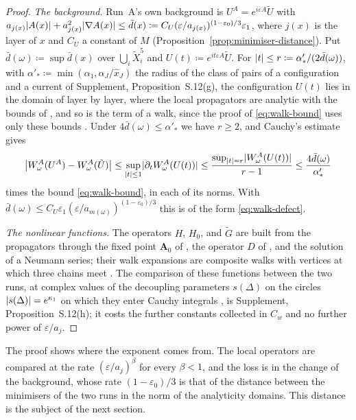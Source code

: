 \documentclass[11pt]{preprint}
\DeclarePairedDelimiter{\abs}{\lvert}{\rvert}
\numberwithin{equation}{section}
\theoremstyle{definition}
\theoremstyle{remark}
\theoremstyle{plain}
\begin{document}
\begin{proof}
\emph{The background.} Run~A's own background is $U^A = e^{i\varepsilon A}\tilde U$ with $a_{j(x)}\abs{A(x)} + a_{j(x)}^2\abs{\nabla A(x)} \leq \bar d(x) \coloneqq C_U(\varepsilon/a_{j(x)})^{(1-\varepsilon_0)/3}\varepsilon_1$, where $j(x)$ is the layer of $x$ and $C_U$ a constant of $M$ (Proposition~\ref{prop:minimiser-distance}). Put $\bar d(\omega) \coloneqq \sup\bar d(x)$ over $\bigcup_i\tilde X_i^5$ and $U(t) \coloneqq e^{it\varepsilon A}\tilde U$. For $\abs{t} \leq r \coloneqq \alpha'_*/(2\bar d(\omega))$, with $\alpha'_* \coloneqq \min(\alpha_1, \alpha_J/\hat x_J)$ the radius of the class of pairs of a configuration and a current of Supplement, Proposition~S.12(g), the configuration $U(t)$ lies in the domain of \cite[(3.37)]{BalabanPBG} layer by layer, where the local propagators are analytic with the bounds of \cite[Theorems~3.1--3.3]{BalabanPBG} \cite[Theorem~3.4, p.~400]{BalabanPBG}, and so is the term of a walk, since the proof of \eqref{eq:walk-bound} uses only these bounds \cite[p.~410]{BalabanPBG}. Under $4\bar d(\omega) \leq \alpha'_*$ we have $r \geq 2$, and Cauchy's estimate gives
\begin{equation}\label{eq:background-change}
    \bigl\lvert W^A_\omega(U^A) - W^A_\omega(\tilde U)\bigr\rvert \leq \sup_{\abs{t} \leq 1}\abs{\partial_tW^A_\omega(U(t))} \leq \frac{\sup_{\abs{t} = r}\abs{W^A_\omega(U(t))}}{r - 1} \leq \frac{4\bar d(\omega)}{\alpha'_*}
\end{equation}
times the bound \eqref{eq:walk-bound}, in each of its norms. With $\bar d(\omega) \leq C_U\varepsilon_1(\varepsilon/a_{m(\omega)})^{(1-\varepsilon_0)/3}$ this is of the form \eqref{eq:walk-defect}.

\emph{The nonlinear functions.} The operators $H$, $H_0$, and $\tilde G$ are built from the propagators through the fixed point $\mathbf A_0$ of \cite[(1.4), p.~2]{BalabanRG2}, the operator $D$ of \cite[(1.3)]{BalabanRG2}, and the solution of a Neumann series; their walk expansions are composite walks with vertices at which three chains meet \cite[p.~427]{BalabanPBG}. The comparison of these functions between the two runs, at complex values of the decoupling parameters $s(\Delta)$ on the circles $\abs{s(\Delta)} = e^{\kappa_1}$ on which they enter Cauchy integrals \cite[(1.23), p.~7]{BalabanRG2}, is Supplement, Proposition~S.12(h); it costs the further constants collected in $C_w$ and no further power of $\varepsilon/a_j$.
\end{proof}

The proof shows where the exponent comes from. The local operators are compared at the rate $(\varepsilon/a_j)^\beta$ for every $\beta < 1$, and the loss is in the change of the background, whose rate $(1 - \varepsilon_0)/3$ is that of the distance between the minimisers of the two runs in the norm of the analyticity domains. This distance is the subject of the next section.
\end{document}
